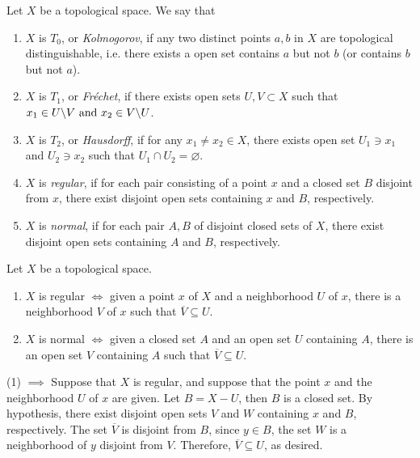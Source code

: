 \begin{definition}
  Let \( X \) be a topological space.
  We say that
  \begin{enumerate}
    \item \( X \) is \( T_0 \), or \emph{Kolmogorov}, if any two distinct points \( a, b \) in \( X \) are topological distinguishable, i.e. there exists a open set contains \( a \) but not \( b \) (or contains \( b \) but not \( a \)).
    \item \( X \) is \( T_1 \), or \emph{Fr\'{e}chet}, if there exists open sets \( U, V \subset X \) such that $x_1 \in U \backslash V \textmd{ and } x_2 \in V \backslash U$.
    \item \( X \) is \( T_2 \), or \emph{Hausdorff}, if for any \( x_1 \neq x_2 \in X \), there exists open set \( U_1 \ni x_1 \) and \( U_2 \ni x_2 \) such that \( U_1 \cap U_2 = \varnothing \).
    \item \( X \) is \emph{regular}, if for each pair consisting of a point \( x \) and a closed set \( B \) disjoint from \( x \), there exist disjoint open sets containing \( x \) and \( B \), respectively.
    \item \( X \) is \emph{normal}, if for each pair \( A, B \) of disjoint closed sets of \( X \), there exist disjoint open sets containing \( A \) and \( B \), respectively.
  \end{enumerate}
\end{definition}

\begin{lemma}
  Let \( X \) be a topological space.
  \begin{enumerate}
    \item \( X \) is regular \( \iff \) given a point \( x \) of \( X \) and a neighborhood \( U \) of \( x \), there is a neighborhood \( V \) of \( x \) such that \( \overline{V} \subseteq U \).
    \item \( X \) is normal \( \iff \) given a closed set \( A \) and an open set \( U \) containing \( A \), there is an open set \( V \) containing \( A \) such that \( \overline{V} \subseteq U \).
  \end{enumerate}
\end{lemma}
\begin{sketchproof}
  (1) \( \implies \) Suppose that \( X \) is regular, and suppose that the point \( x \) and the neighborhood \( U \) of \( x \) are given.
  Let \( B = X - U \), then \( B \) is a closed set.
  By hypothesis, there exist disjoint open sets \( V \) and \( W \) containing \( x \) and \( B \), respectively.
  The set \( \overline{V} \) is disjoint from \( B \), since \( y \in B \), the set \( W \) is a neighborhood of \( y \) disjoint from \( V \).
  Therefore, \( \overline{V} \subseteq U \), as desired.
\end{sketchproof}

